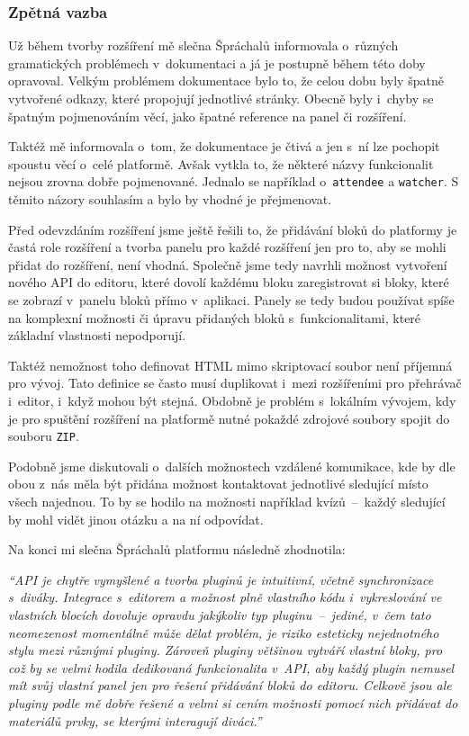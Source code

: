 \subsubsection{Zpětná vazba}

Už během tvorby rozšíření mě slečna Špráchalů informovala o~různých gramatických problémech v~dokumentaci a já je postupně během této doby opravoval.
Velkým problémem dokumentace bylo to, že celou dobu byly špatně vytvořené odkazy, které propojují jednotlivé stránky.
Obecně byly i~chyby se špatným pojmenováním věcí, jako špatné reference na panel či rozšíření.

Taktéž mě informovala o~tom, že dokumentace je čtivá a jen s~ní lze pochopit spoustu věcí o~celé platformě.
Avšak vytkla to, že některé názvy funkcionalit nejsou zrovna dobře pojmenované. 
Jednalo se například o~\verb|attendee| a \verb|watcher|.
S těmito názory souhlasím a bylo by vhodné je přejmenovat. 

Před odevzdáním rozšíření jsme ještě řešili to, že přidávání bloků do platformy je častá role rozšíření a tvorba panelu pro každé rozšíření jen pro to, aby se mohli přidat do rozšíření, není vhodná.
Společně jsme tedy navrhli možnost vytvoření nového API do editoru, které dovolí každému bloku zaregistrovat si bloky, které se zobrazí v~panelu bloků přímo v~aplikaci.
Panely se tedy budou používat spíše na komplexní možnosti či úpravu přidaných bloků s~funkcionalitami, které základní vlastnosti nepodporují.

Taktéž nemožnost toho definovat HTML mimo skriptovací soubor není příjemná pro vývoj.
Tato definice se často musí duplikovat i~mezi rozšířeními pro přehrávač i~editor, i~když mohou být stejná.
Obdobně je problém s~lokálním vývojem, kdy je pro spuštění rozšíření na platformě nutné pokaždé zdrojové soubory spojit do souboru \verb|ZIP|.


Podobně jsme diskutovali o~dalších možnostech vzdálené komunikace, kde by dle obou z~nás měla být přidána možnost kontaktovat jednotlivé sledující místo všech najednou.
To by se hodilo na možnosti například kvízů~--~každý sledující by mohl vidět jinou otázku a na ní odpovídat.

Na konci mi slečna Špráchalů platformu následně zhodnotila:

\vspace{1em}

\textit{\enquote{API je chytře vymyšlené a tvorba pluginů je intuitivní, včetně synchronizace s~diváky. Integrace s~editorem a možnost plně vlastního kódu i~vykreslování ve vlastních blocích dovoluje opravdu jakýkoliv typ pluginu~--~jediné, v~čem tato neomezenost momentálně může dělat problém, je riziko esteticky nejednotného stylu mezi různými pluginy. Zároveň pluginy většinou vytváří vlastní bloky, pro což by se velmi hodila dedikovaná funkcionalita v~API, aby každý plugin nemusel mít svůj vlastní panel jen pro řešení přidávání bloků do editoru.
Celkově jsou ale pluginy podle mě dobře řešené a velmi si cením možnosti pomocí nich přidávat do materiálů prvky, se kterými interagují diváci.}}


